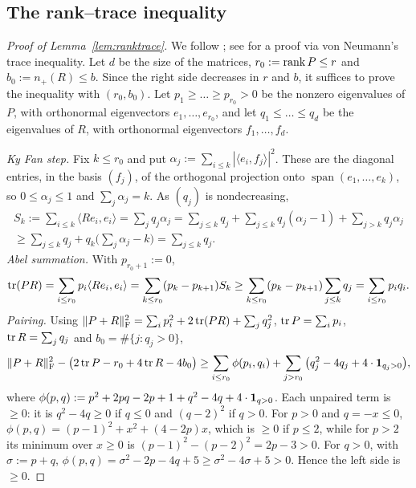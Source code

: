 \documentclass[11pt]{amsart}
\theoremstyle{definition}
\theoremstyle{remark}
\numberwithin{equation}{section}
\begin{document}
\subsection{The rank--trace inequality}
\begin{proof}[Proof of Lemma~\ref{lem:ranktrace}]
We follow \cite[Lemma~8.2]{HY26}; see \cite[Lemma~3.2]{AF26} for a proof via von Neumann's trace inequality. Let $d$ be the size of the matrices, $r_0:=\operatorname{rank} P\le r$ and $b_0:=n_+(R)\le b$. Since the right side decreases in $r$ and $b$, it suffices to prove the inequality with $(r_0,b_0)$. Let $p_1\ge\dots\ge p_{r_0}>0$ be the nonzero eigenvalues of $P$, with orthonormal eigenvectors $e_1,\dots,e_{r_0}$, and let $q_1\le\dots\le q_d$ be the eigenvalues of $R$, with orthonormal eigenvectors $f_1,\dots,f_d$.

\emph{Ky Fan step.} Fix $k\le r_0$ and put $\alpha_j:=\sum_{i\le k}|\langle e_i,f_j\rangle|^2$. These are the diagonal entries, in the basis $(f_j)$, of the orthogonal projection onto $\operatorname{span}(e_1,\dots,e_k)$, so $0\le\alpha_j\le1$ and $\sum_j\alpha_j=k$. As $(q_j)$ is nondecreasing,
\begin{multline*}
S_k:=\sum_{i\le k}\langle Re_i,e_i\rangle=\sum_jq_j\alpha_j=\sum_{j\le k}q_j+\sum_{j\le k}q_j(\alpha_j-1)+\sum_{j>k}q_j\alpha_j\\
\ge\sum_{j\le k}q_j+q_k\Big(\sum_j\alpha_j-k\Big)=\sum_{j\le k}q_j .
\end{multline*}
\emph{Abel summation.} With $p_{r_0+1}:=0$,
\[
\operatorname{tr}(PR)=\sum_{i\le r_0}p_i\langle Re_i,e_i\rangle=\sum_{k\le r_0}(p_k-p_{k+1})S_k\ge\sum_{k\le r_0}(p_k-p_{k+1})\sum_{j\le k}q_j=\sum_{i\le r_0}p_iq_i .
\]
\emph{Pairing.} Using $\|P+R\|_\mathrm F^2=\sum_ip_i^2+2\operatorname{tr}(PR)+\sum_jq_j^2$, $\operatorname{tr} P=\sum_ip_i$, $\operatorname{tr} R=\sum_jq_j$ and $b_0=\#\{j:q_j>0\}$,
\[
\|P+R\|_\mathrm F^2-\big(2\operatorname{tr} P-r_0+4\operatorname{tr} R-4b_0\big)\ge\sum_{i\le r_0}\phi(p_i,q_i)+\sum_{j>r_0}\big(q_j^2-4q_j+4\cdot\mathbf 1_{q_j>0}\big),
\]
where $\phi(p,q):=p^2+2pq-2p+1+q^2-4q+4\cdot\mathbf 1_{q>0}$. Each unpaired term is $\ge0$: it is $q^2-4q\ge0$ if $q\le0$ and $(q-2)^2$ if $q>0$. For $p>0$ and $q=-x\le0$, $\phi(p,q)=(p-1)^2+x^2+(4-2p)x$, which is $\ge0$ if $p\le2$, while for $p>2$ its minimum over $x\ge0$ is $(p-1)^2-(p-2)^2=2p-3>0$. For $q>0$, with $\sigma:=p+q$, $\phi(p,q)=\sigma^2-2p-4q+5\ge\sigma^2-4\sigma+5>0$. Hence the left side is $\ge0$.
\end{proof}



\end{document}
